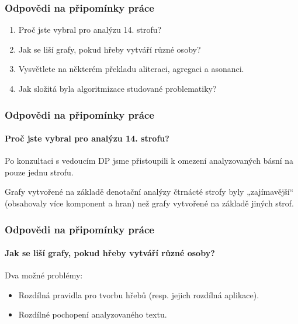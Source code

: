 \documentclass[12pt]{beamer}
\begin{document}
\begin{frame}
	\frametitle{Odpovědi na připomínky práce}

	\begin{enumerate}
		\item Proč jste vybral pro analýzu 14. strofu?
		\item Jak se liší grafy, pokud hřeby vytváří různé osoby?
		\item Vysvětlete na některém překladu aliteraci, agregaci a asonanci.				
		\item Jak složitá byla algoritmizace studované problematiky?				
	\end{enumerate}
\end{frame}

\begin{frame}
	\frametitle{Odpovědi na připomínky práce}
	\framesubtitle{Proč jste vybral pro analýzu 14. strofu?}

	Po konzultaci s vedoucím DP jsme přistoupili k omezení analyzovaných básní na pouze jednu strofu.
	
	Grafy vytvořené na základě denotační analýzy čtrnácté strofy byly „zajímavější“ (obsahovaly více komponent a hran) než grafy vytvořené na základě jiných strof.
\end{frame}

\begin{frame}
	\frametitle{Odpovědi na připomínky práce}
	\framesubtitle{Jak se liší grafy, pokud hřeby vytváří různé osoby?}

	Dva možné problémy:
	
	\begin{itemize}
		\item Rozdílná pravidla pro tvorbu hřebů (resp. jejich rozdílná aplikace).
		\item Rozdílné pochopení analyzovaného textu.
	\end{itemize}
\end{frame}
\end{document}
